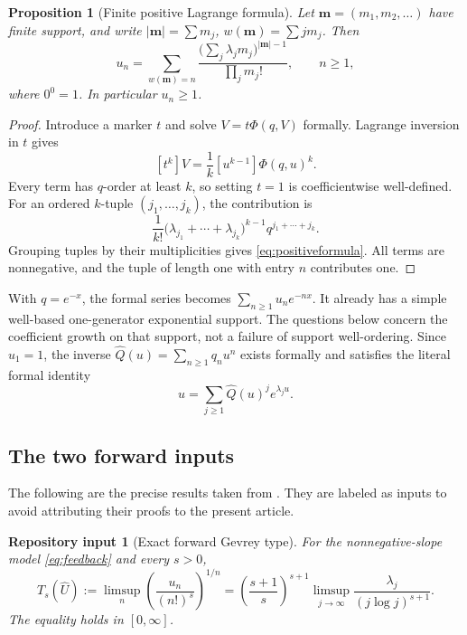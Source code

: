 \documentclass[11pt,a4paper]{article}
\numberwithin{equation}{section}
\newtheorem{proposition}[theorem]{Proposition}
\newtheorem{inputtheorem}[theorem]{Repository input}
\theoremstyle{definition}
\theoremstyle{remark}
\newcommand{\Q}{\widehat Q}
\newcommand{\U}{\widehat U}
\begin{document}
\begin{proposition}[Finite positive Lagrange formula]
\label{prop:feedbackcoef}
Let $\mathbf m=(m_1,m_2,\ldots)$ have finite support, and write
$|\mathbf m|=\sum m_j$, $w(\mathbf m)=\sum jm_j$. Then
\begin{equation}
 u_n=\sum_{w(\mathbf m)=n}
 \frac{\bigl(\sum_j\lambda_jm_j\bigr)^{|\mathbf m|-1}}
      {\prod_jm_j!},\qquad n\ge1,
 \label{eq:positiveformula}
\end{equation}
where $0^0=1$. In particular $u_n\ge1$.
\end{proposition}
\begin{proof}
Introduce a marker $t$ and solve $V=t\Phi(q,V)$ formally. Lagrange
inversion in $t$ gives
\[
 [t^k]V=\frac1k[u^{k-1}]\Phi(q,u)^k.
\]
Every term has $q$-order at least $k$, so setting $t=1$ is coefficientwise
well-defined. For an ordered $k$-tuple $(j_1,\ldots,j_k)$, the contribution
is
\[
 \frac1{k!}\bigl(\lambda_{j_1}+\cdots+\lambda_{j_k}\bigr)^{k-1}
 q^{j_1+\cdots+j_k}.
\]
Grouping tuples by their multiplicities gives
\eqref{eq:positiveformula}. All terms are nonnegative, and the tuple of
length one with entry $n$ contributes one.
\end{proof}

With $q=e^{-x}$, the formal series becomes
$\sum_{n\ge1}u_ne^{-nx}$. It already has a simple well-based
one-generator exponential support. The questions below concern the
coefficient growth on that support, not a failure of support
well-ordering. Since $u_1=1$, the inverse $\Q(u)=\sum_{n\ge1}q_nu^n$
exists formally and satisfies the literal formal identity
\begin{equation}
 u=\sum_{j\ge1}\Q(u)^j e^{\lambda_j u}.
 \label{eq:inversekernel}
\end{equation}

\subsection{The two forward inputs}

The following are the precise results taken from \cite{feedback}. They
are labeled as inputs to avoid attributing their proofs to the present
article.

\begin{inputtheorem}[Exact forward Gevrey type]
\label{input:forwardtype}
For the nonnegative-slope model \eqref{eq:feedback} and every $s>0$,
\begin{equation}
 T_s(\U):=\limsup_n\left(\frac{u_n}{(n!)^s}\right)^{1/n}
 =\left(\frac{s+1}{s}\right)^{s+1}
   \limsup_{j\to\infty}\frac{\lambda_j}{(j\log j)^{s+1}}.
 \label{eq:forwardtype}
\end{equation}
The equality holds in $[0,\infty]$.
\end{inputtheorem}
\end{document}
